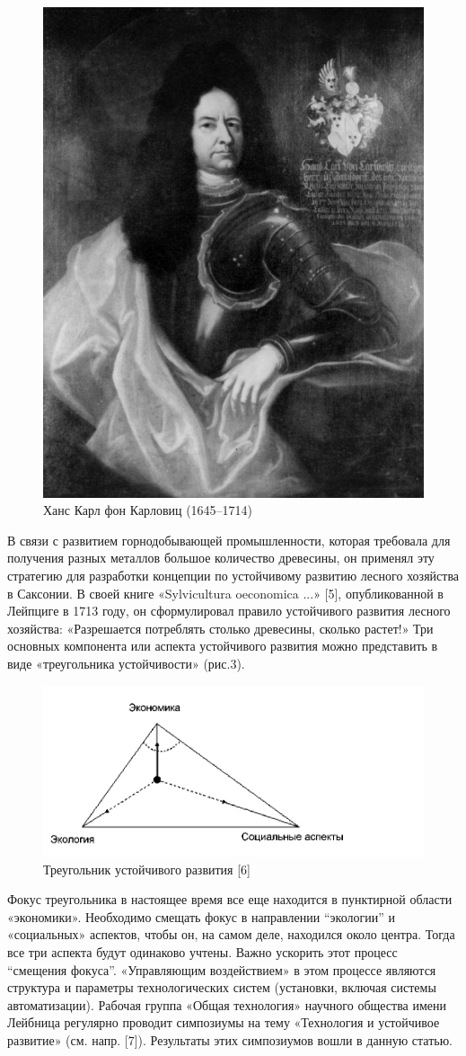 \documentclass[11pt,a4paper]{article}
\begin{document}
\begin{figure}\vspace*{-1em}
\includegraphics[width=.25\textwidth]{oQWNOq.png}
\caption{Ханс Карл фон Карловиц (1645--1714)} 
\end{figure}
В связи с развитием горнодобывающей промышленности, которая требовала для
получения разных металлов большое количество древесины, он применял эту
стратегию для разработки концепции по устойчивому развитию лесного хозяйства в
Саксонии. В своей книге  «Sylvicultura oeconomica ...» [5], опубликованной в
Лейпциге в 1713 году, он сформулировал правило устойчивого развития лесного
хозяйства:  «Разрешается потреблять столько древесины, сколько растет!»  Три
основных компонента или аспекта устойчивого развития можно представить в виде
«треугольника устойчивости» (рис.3).
\begin{figure}[h]
  \begin{center}
    \includegraphics[width=.75\textwidth]{a7McJu.png}
    \caption{Треугольник устойчивого развития [6]} 
  \end{center}  
\end{figure}
Фокус треугольника в настоящее время все еще находится в пунктирной области
«экономики». Необходимо смещать фокус в направлении “экологии” и  «социальных»
аспектов, чтобы он, на самом деле, находился около центра. Тогда все три
аспекта будут одинаково учтены. Важно ускорить этот процесс “смещения фокуса”.
«Управляющим воздействием» в этом процессе являются структура и параметры
технологических систем (установки, включая системы автоматизации). Рабочая
группа  «Общая технология» научного общества имени Лейбница регулярно проводит
симпозиумы на тему  «Технология и устойчивое развитие» (см. напр. [7]).
Результаты этих симпозиумов вошли в данную статью.
\end{document}
